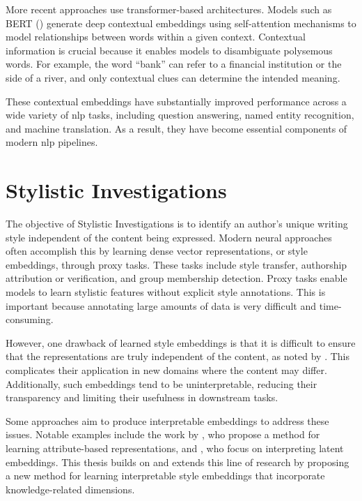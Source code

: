 More recent approaches use transformer-based architectures. Models such as BERT (\cite{devlin-etal-2019-bert}) generate deep contextual embeddings using self-attention mechanisms to model relationships between words within a given context. Contextual information is crucial because it enables models to disambiguate polysemous words. For example, the word \enquote{bank} can refer to a financial institution or the side of a river, and only contextual clues can determine the intended meaning.

These contextual embeddings have substantially improved performance across a wide variety of \ac{nlp} tasks, including question answering, named entity recognition, and machine translation. As a result, they have become essential components of modern \ac{nlp} pipelines.

\section{Stylistic Investigations}
\label{sec:background:styleInvestigations}
The objective of Stylistic Investigations is to identify an author's unique writing style independent of the content being expressed. Modern neural approaches often accomplish this by learning dense vector representations, or style embeddings, through proxy tasks. These tasks include style transfer, authorship attribution or verification, and group membership detection. Proxy tasks enable models to learn stylistic features without explicit style annotations. This is important because annotating large amounts of data is very difficult and time-consuming.

However, one drawback of learned style embeddings is that it is difficult to ensure that the representations are truly independent of the content, as noted by \citet{wegmannSameAuthorJust2022}. This complicates their application in new domains where the content may differ. Additionally, such embeddings tend to be uninterpretable, reducing their transparency and limiting their usefulness in downstream tasks.

Some approaches aim to produce interpretable embeddings to address these issues. Notable examples include the work by \citet{patelLearningInterpretableStyle2023}, who propose a method for learning attribute-based representations, and \citet{alshomaryLatentSpaceInterpretation2024}, who focus on interpreting latent embeddings. This thesis builds on and extends this line of research by proposing a new method for learning interpretable style embeddings that incorporate knowledge-related dimensions.

